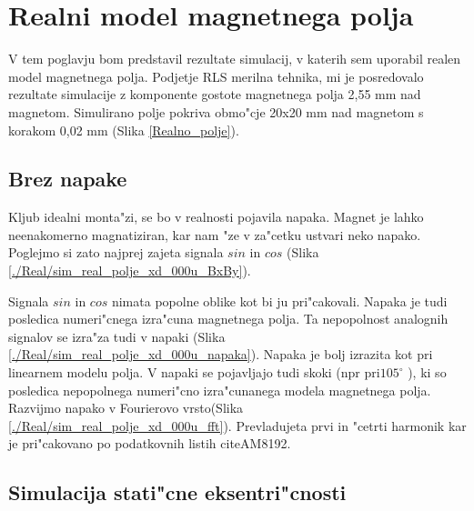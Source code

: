 

\chapter{Realni model magnetnega polja}

V tem poglavju bom predstavil rezultate simulacij, v katerih sem uporabil realen model magnetnega polja. Podjetje RLS merilna tehnika, mi je posredovalo rezultate simulacije z komponente gostote magnetnega polja 2,55 mm nad magnetom.  Simulirano polje pokriva obmo"cje 20x20 mm nad magnetom s korakom 0,02 mm (Slika \ref{Realno_polje}).




\section{Brez napake}
Kljub idealni monta"zi, se bo  v realnosti pojavila napaka. Magnet je lahko neenakomerno magnatiziran, kar nam "ze v za"cetku ustvari neko napako.
Poglejmo si zato najprej zajeta signala $sin$ in $cos$ (Slika \ref{./Real/sim_real_polje_xd_000u_BxBy}).

Signala $sin$ in $cos$ nimata popolne oblike kot bi ju pri"cakovali. Napaka je tudi posledica numeri"cnega izra"cuna magnetnega polja. Ta nepopolnost analognih signalov se izra"za tudi v napaki (Slika \ref{./Real/sim_real_polje_xd_000u_napaka}).
Napaka je bolj izrazita kot pri linearnem modelu polja. V napaki se pojavljajo tudi skoki (npr pri$105^{\circ}$ ), ki so posledica nepopolnega numeri"cno izra"cunanega modela magnetnega polja.
Razvijmo napako v Fourierovo vrsto(Slika \ref{./Real/sim_real_polje_xd_000u_fft}).
Prevladujeta prvi in "cetrti harmonik kar je pri"cakovano po podatkovnih listih citeAM8192.

\section{Simulacija stati"cne eksentri"cnosti}

